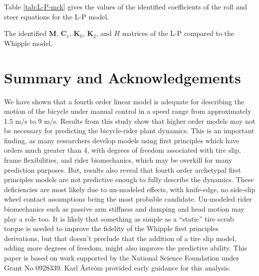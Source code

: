 \documentclass[a4paper]{article}
\begin{document}
Table \ref{tab:L-P-mck} gives the values of the identified coefficients of the
roll and steer equations for the L-P model.

\begin{table}
  \label{tab:L-P-mck}
  \centering
  \caption{The identified $\mathbf{M}$, $\mathbf{C}_1$, $\mathbf{K}_0$,
    $\mathbf{K}_2$, and $H$ matrices of the L-P compared to the  Whipple model.}
  \small
  
\end{table}

\section*{Summary and Acknowledgements}

We have shown that a fourth order linear model is adequate for describing the
motion of the bicycle under manual control in a speed range from approximately
1.5 m/s to 9 m/s. Results from this study show that higher order models may
not be necessary for predicting the bicycle-rider plant dynamics. This is an
important finding, as many researchers develop models using first principles
which have orders much greater than 4, with degrees of freedom associated with
tire slip, frame flexibilities, and rider biomechanics, which may be overkill
for many prediction purposes. But, results also reveal that fourth order
archetypal first principles models are not predictive enough to fully describe
the dynamics. These deficiencies are most likely due to un-modeled effects,
with knife-edge, no side-slip wheel contact assumptions being the most probable
candidate. Un-modeled rider biomechanics such as passive arm stiffness and
damping and head motion may play a role too. It is likely that something as
simple as a ``static'' tire scrub torque is needed to improve the fidelity of
the Whipple first principles derivations, but that doesn't preclude that the
addition of a tire slip model, adding more degrees of freedom, might also
improve the predictive ability. This paper is based on work supported by the
National Science Foundation under Grant No 0928339. Karl {\AA}str{\"o}m
provided early guidance for this analysis.



\end{document}
